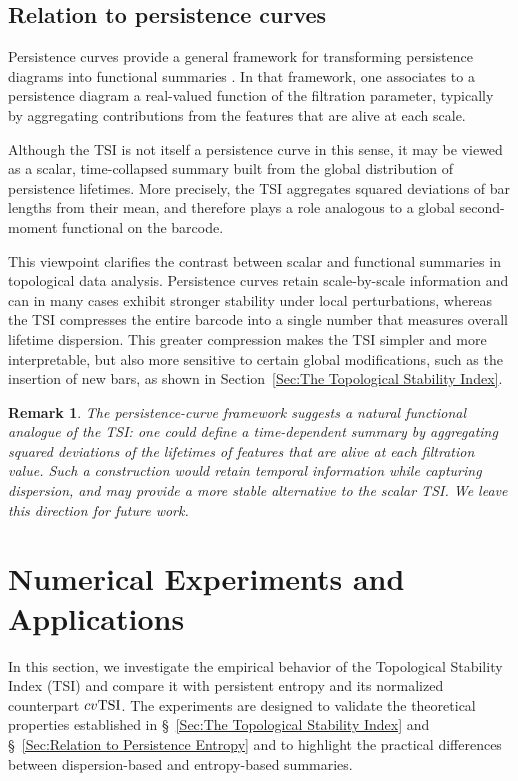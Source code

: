 \documentclass[11pt]{amsart}
\newtheorem*{remark}{Remark}
\theoremstyle{definition}
\newcommand{\tsi}[0]{\textup{TSI}}
\begin{document}
\subsection{Relation to persistence curves}

Persistence curves provide a general framework for transforming persistence diagrams into functional summaries \cite{chung_persistence_2022}. In that framework, one associates to a persistence diagram a real-valued function of the filtration parameter, typically by aggregating contributions from the features that are alive at each scale.

Although the TSI is not itself a persistence curve in this sense, it may be viewed as a scalar, time-collapsed summary built from the global distribution of persistence lifetimes. More precisely, the TSI aggregates squared deviations of bar lengths from their mean, and therefore plays a role analogous to a global second-moment functional on the barcode.

This viewpoint clarifies the contrast between scalar and functional summaries in topological data analysis. Persistence curves retain scale-by-scale information and can in many cases exhibit stronger stability under local perturbations, whereas the TSI compresses the entire barcode into a single number that measures overall lifetime dispersion. This greater compression makes the TSI simpler and more interpretable, but also more sensitive to certain global modifications, such as the insertion of new bars, as shown in Section~\ref{Sec:The Topological Stability Index}.

\begin{remark}\rm
The persistence-curve framework suggests a natural functional analogue of the TSI: one could define a time-dependent summary by aggregating squared deviations of the lifetimes of features that are alive at each filtration value. Such a construction would retain temporal information while capturing dispersion, and may provide a more stable alternative to the scalar TSI. We leave this direction for future work.
\end{remark}




\section{Numerical Experiments and Applications}\label{Sec:Numerical Experiments and Applications}
In this section, we investigate the empirical behavior of the Topological Stability Index (TSI) and compare it with persistent entropy and its normalized counterpart $cv\tsi$. The experiments are designed to validate the theoretical properties established in \S~\ref{Sec:The Topological Stability Index} and \S~\ref{Sec:Relation to Persistence Entropy} and to highlight the practical differences between dispersion-based and entropy-based summaries.
\end{document}
